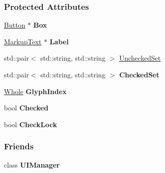 \subsubsection*{Protected Attributes}
\begin{DoxyCompactItemize}
\item 
\hypertarget{classphys_1_1UI_1_1CheckBox_a1118ba10131845d77085bc1b9e41fdab}{
\hyperlink{classphys_1_1UI_1_1Button}{Button} $\ast$ {\bfseries Box}}
\label{dd/d10/classphys_1_1UI_1_1CheckBox_a1118ba10131845d77085bc1b9e41fdab}

\item 
\hypertarget{classphys_1_1UI_1_1CheckBox_a99640351f23baac8e36ef3d64140e404}{
\hyperlink{classphys_1_1UI_1_1MarkupText}{MarkupText} $\ast$ {\bfseries Label}}
\label{dd/d10/classphys_1_1UI_1_1CheckBox_a99640351f23baac8e36ef3d64140e404}

\item 
std::pair$<$ std::string, std::string $>$ \hyperlink{classphys_1_1UI_1_1CheckBox_a7b670d93f119193283ec78b94f842429}{UncheckedSet}
\item 
\hypertarget{classphys_1_1UI_1_1CheckBox_ae4bb7dad2474b7f74ebe1320fef7a58e}{
std::pair$<$ std::string, std::string $>$ {\bfseries CheckedSet}}
\label{dd/d10/classphys_1_1UI_1_1CheckBox_ae4bb7dad2474b7f74ebe1320fef7a58e}

\item 
\hypertarget{classphys_1_1UI_1_1CheckBox_afc37b1eaaf6ab441a71569757802571b}{
\hyperlink{namespacephys_a460f6bc24c8dd347b05e0366ae34f34a}{Whole} {\bfseries GlyphIndex}}
\label{dd/d10/classphys_1_1UI_1_1CheckBox_afc37b1eaaf6ab441a71569757802571b}

\item 
\hypertarget{classphys_1_1UI_1_1CheckBox_af539bce89119b8e21fa19f170cc5d7e5}{
bool {\bfseries Checked}}
\label{dd/d10/classphys_1_1UI_1_1CheckBox_af539bce89119b8e21fa19f170cc5d7e5}

\item 
\hypertarget{classphys_1_1UI_1_1CheckBox_ae8f71565ce43129a44930131850d6e16}{
bool {\bfseries CheckLock}}
\label{dd/d10/classphys_1_1UI_1_1CheckBox_ae8f71565ce43129a44930131850d6e16}

\end{DoxyCompactItemize}
\subsubsection*{Friends}
\begin{DoxyCompactItemize}
\item 
\hypertarget{classphys_1_1UI_1_1CheckBox_ab811b36cd63b54fe42b6acb231ea21bc}{
class {\bfseries UIManager}}
\label{dd/d10/classphys_1_1UI_1_1CheckBox_ab811b36cd63b54fe42b6acb231ea21bc}

\end{DoxyCompactItemize}


